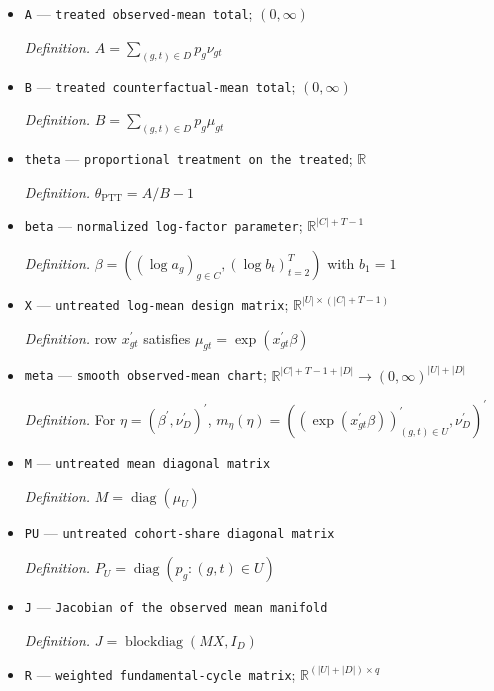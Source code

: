 \documentclass{article}
\begin{document}
\begin{itemize}
  \item \texttt{A} --- \texttt{treated observed-\allowbreak{}mean total}; \((0,\infty)\)
  \par\smallskip\noindent\emph{Definition.} \(A=\sum_{(g,t)\in D}p_g\nu_{gt}\)
  \item \texttt{B} --- \texttt{treated counterfactual-\allowbreak{}mean total}; \((0,\infty)\)
  \par\smallskip\noindent\emph{Definition.} \(B=\sum_{(g,t)\in D}p_g\mu_{gt}\)
  \item \texttt{theta} --- \texttt{proportional treatment on the treated}; \(\mathbb R\)
  \par\smallskip\noindent\emph{Definition.} \(\theta_{\mathrm{PTT}}=A/B-1\)
  \item \texttt{beta} --- \texttt{normalized log-\allowbreak{}factor parameter}; \(\mathbb R^{|C|+T-1}\)
  \par\smallskip\noindent\emph{Definition.} \(\beta=((\log a_g)_{g\in C},(\log b_t)_{t=2}^T)\) with \(b_1=1\)
  \item \texttt{X} --- \texttt{untreated log-\allowbreak{}mean design matrix}; \(\mathbb R^{|U|\times(|C|+T-1)}\)
  \par\smallskip\noindent\emph{Definition.} row \(x_{gt}^{\prime}\) satisfies \(\mu_{gt}=\exp(x_{gt}^{\prime}\beta)\)
  \item \texttt{meta} --- \texttt{smooth observed-\allowbreak{}mean chart}; \(\mathbb R^{|C|+T-1+|D|}\to(0,\infty)^{|U|+|D|}\)
  \par\smallskip\noindent\emph{Definition.} For \(\eta=(\beta^{\prime},\nu_D^{\prime})^{\prime}\), \(m_{\eta}(\eta)=((\exp(x_{gt}^{\prime}\beta))_{(g,t)\in U}^{\prime},\nu_D^{\prime})^{\prime}\)
  \item \texttt{M} --- \texttt{untreated mean diagonal matrix}
  \par\smallskip\noindent\emph{Definition.} \(M=\operatorname{diag}(\mu_U)\)
  \item \texttt{PU} --- \texttt{untreated cohort-\allowbreak{}share diagonal matrix}
  \par\smallskip\noindent\emph{Definition.} \(P_U=\operatorname{diag}(p_g:(g,t)\in U)\)
  \item \texttt{J} --- \texttt{Jacobian of the observed mean manifold}
  \par\smallskip\noindent\emph{Definition.} \(J=\operatorname{blockdiag}(MX,I_D)\)
  \item \texttt{R} --- \texttt{weighted fundamental-\allowbreak{}cycle matrix}; \(\mathbb R^{(|U|+|D|)\times q}\)

\end{itemize}
\end{document}
